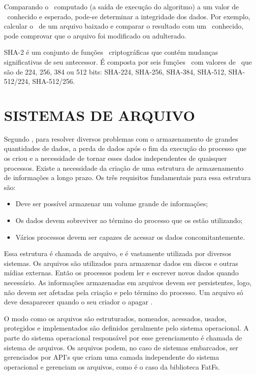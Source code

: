 Comparando o \hash\ computado (a saída de execução do algoritmo) a um valor de \hash\ conhecido e esperado, pode-se determinar a integridade dos dados. Por exemplo, calcular o \hash\ de um arquivo baixado e comparar o resultado com um \hash\ conhecido, pode comprovar que o arquivo foi modificado ou adulterado.

SHA-2 é um conjunto de funções \hash\ criptográficas que contém mudanças significativas de seu antecessor. É composta por seis funções \hash\ com valores de \hash\ que são de 224, 256, 384 ou 512 bits: SHA-224, SHA-256, SHA-384, SHA-512, SHA-512/224, SHA-512/256.



\section{SISTEMAS DE ARQUIVO}
Segundo , para resolver diversos problemas com o armazenamento de grandes quantidades de dados, a perda de dados após o fim da execução do processo que os criou e a necessidade de tornar esses dados independentes de quaisquer processos. Existe a necessidade da criação de uma estrutura de armazenamento de informações a longo prazo. Os três requisitos fundamentais para essa estrutura são:

\begin{itemize}
    \item Deve ser possível armazenar um volume grande de informações;
    \item Os dados devem sobreviver ao término do processo que os estão utilizando;
    \item Vários processos devem ser capazes de acessar os dados concomitantemente.
\end{itemize}

Essa estrutura é chamada de arquivo, e é vastamente utilizada por diversos sistemas. Os arquivos são utilizados para armazenar dados em discos e outras mídias externas. Então os processos podem ler e escrever novos dados quando necessário. As informações armazenadas em arquivos devem ser persistentes, logo, não devem ser afetadas pela criação e pelo término do processo. Um arquivo só deve desaparecer quando o seu criador o apagar \cite{tanenbaumSO}.

O modo como os arquivos são estruturados, nomeados, acessados, usados, protegidos e implementados são definidos geralmente pelo sistema operacional. A parte do sistema operacional responsável por esse gerenciamento é chamada de sistema de arquivos. Os arquivos podem, no caso de sistemas embarcados, ser gerenciados por API's que criam uma camada independente do sistema operacional e gerenciam os arquivos, como é o caso da biblioteca FatFs. 


